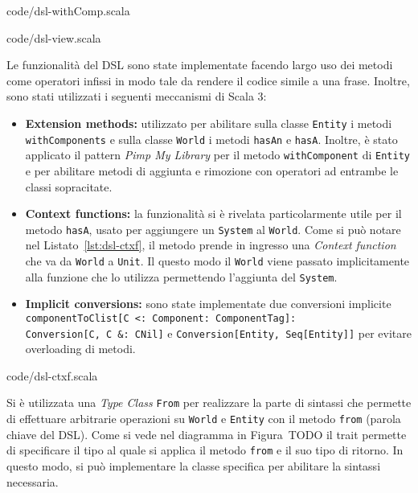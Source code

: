 
{code/dsl-withComp.scala}


{code/dsl-view.scala}

Le funzionalità del DSL sono state implementate facendo largo uso dei metodi come operatori infissi in modo tale
da rendere il codice simile a una frase.
Inoltre, sono stati utilizzati i seguenti meccanismi di Scala 3:
\begin{itemize}
    \item \textbf{Extension methods:} utilizzato per abilitare sulla classe \texttt{Entity} i metodi \texttt{withComponents}
    e sulla classe \texttt{World} i metodi \texttt{hasAn} e \texttt{hasA}.
    Inoltre, è stato applicato il pattern \textit{Pimp My Library} per il metodo \texttt{withComponent} di \texttt{Entity} e per abilitare metodi di aggiunta e rimozione con operatori
    ad entrambe le classi sopracitate.
    \item \textbf{Context functions\cite{contextfunctions}:} la funzionalità si è rivelata particolarmente utile per il metodo \texttt{hasA}, usato per aggiungere
    un \texttt{System} al \texttt{World}.
    Come si può notare nel Listato~\ref{lst:dsl-ctxf}, il metodo prende in ingresso una \textit{Context function} che va da \texttt{World} a \texttt{Unit}.
    Il questo modo il \texttt{World} viene passato implicitamente alla funzione che lo utilizza permettendo l'aggiunta del \texttt{System}.
    \item \textbf{Implicit conversions:} sono state implementate due conversioni implicite\\
    \texttt{componentToClist[C~<:~Component:~ComponentTag]:\\Conversion[C,~C~\&:~CNil]}
    e \texttt{Conversion[Entity,~Seq[Entity]]} per evitare overloading di metodi.
\end{itemize}


{code/dsl-ctxf.scala}

Si è utilizzata una \textit{Type Class} \texttt{From} per realizzare la parte di sintassi che permette di effettuare arbitrarie operazioni su \texttt{World} e \texttt{Entity}
con il metodo \texttt{from} (parola chiave del DSL).
Come si vede nel diagramma in Figura~TODO il trait permette di specificare il tipo al quale si applica il metodo \texttt{from} e il suo tipo di ritorno.
In questo modo, si può implementare la classe specifica per abilitare la sintassi necessaria.


